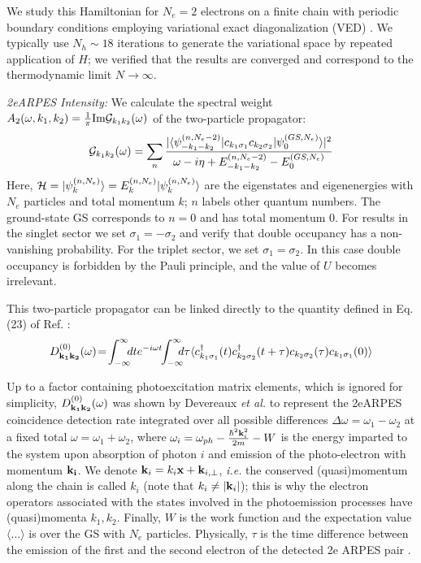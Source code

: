 \documentclass[prl,twocolumn,showpacs,amsmath,amssymb,superscriptaddress,floatfix]{revtex4}
\begin{document}
We study this Hamiltonian for $N_e=2$ electrons on a finite chain with periodic boundary conditions employing variational exact diagonalization (VED) \cite{bonca1,bonca2000prl,bonca2002,bonca2021,Klemen2024,KlemenPRB2025}. We  typically use $N_h\sim 18$ iterations to generate the variational space by repeated application of $H$; we verified that the results are converged and correspond to the thermodynamic limit $N \rightarrow \infty$.

{\em 2eARPES Intensity:} We calculate the spectral weight $A_2(\omega,k_1,k_2) = {1\over \pi} \mbox{Im} {\cal G}_{k_1k_2}(\omega)$ of the  two-particle propagator:
\begin{equation}
    {\cal G}_{k_1k_2}(\omega) = \sum_{n} \frac{|\langle \psi^{(n,N_e-2)}_{ -k_1-k_2}| c_{k_1\sigma_1 }c_{k_2\sigma_2}| \psi^{(GS,N_e)}_0\rangle|^2}{\omega - i \eta +E_{-k_1-k_2}^{(n,N_e-2)}-E_0^{(GS,N_e)}}
    \label{G}
\end{equation}
Here, ${\cal H}  = |\psi_k^{(n,N_e)}\rangle =E_k^{(n,N_e)}|\psi_k^{(n,N_e)}\rangle$ are the eigenstates and eigenenergies with $N_e$ particles and total momentum $k$; $n$ labels other quantum numbers. The ground-state GS corresponds to $n=0$ and has total momentum 0.
For results in the singlet sector we set $\sigma_1=-\sigma_2$ and verify that double occupancy has a non-vanishing probability. For the triplet sector, we set $\sigma_1=\sigma_2$. In this case double occupancy is forbidden by the Pauli principle, and the value of $U$ becomes irrelevant.

\begin{widetext}
This two-particle propagator can be linked directly to
the quantity defined in Eq. (23) of Ref. :
\begin{equation}
    D^{(0)}_{{\bf k_1 k_2}}(\omega) \!= \!\int_{-\infty}^{\infty}\!\!\! dt e^{-i\omega t}\!\!\int_{-\infty}^{\infty}\!\!\!\! d\tau \langle c^\dagger_{k_1\sigma_1}(t) c^\dagger_{k_2\sigma_2}(t+\tau) c_{k_2\sigma_2}(\tau) c_{k_1\sigma_1}(0)
\rangle
\label{Dev}
\end{equation}
\end{widetext}
Up to a factor containing photoexcitation matrix elements,  which is  ignored for simplicity, $D^{(0)}_{{\bf k_1 k_2}}(\omega)$ was shown by Devereaux {\em et al.} \cite{Devereaux_2023} to represent the 2eARPES coincidence detection rate integrated over all possible differences $\Delta \omega =\omega_1 -\omega_2$ at a fixed total $\omega = \omega_1+\omega_2$, where $\omega_i= \omega_{ph} - {\hbar^2 {\bf k}_i^2\over 2m}-W$ is the energy imparted to  the system upon absorption of photon $i$ and emission of the photo-electron with momentum ${\bf k_i}$. We denote ${\bf k}_i= k_i{\bf x} + {\bf k}_{i,\perp}$, {\em i.e.} the conserved (quasi)momentum along the chain is called $k_i$ (note that $k_i \ne |{\bf k}_i|$); this is why the electron  operators associated with the  states involved in the photoemission processes have (quasi)momenta $k_1,k_2$. Finally, $W$ is the work function and the expectation value $\langle \dots \rangle$ is over the GS with $N_e$ particles. Physically, $\tau$ is the time difference between the emission of the first and the second electron of the detected 2e ARPES pair \cite{Devereaux_2023}.
\end{document}
